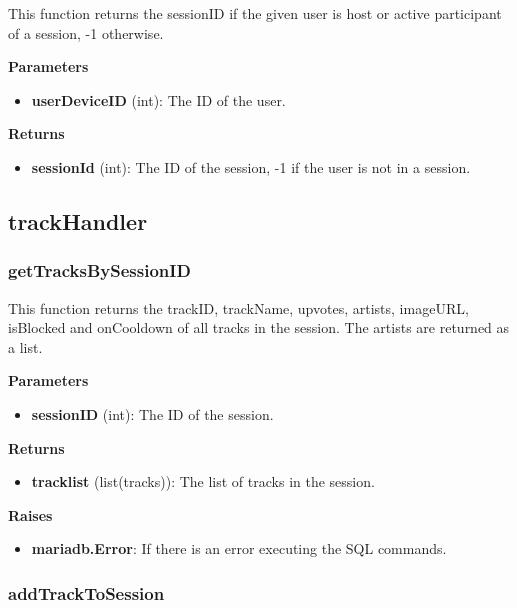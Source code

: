 \documentclass[oneside, ngerman]{sdqtechreport}
\begin{document}
This function returns the sessionID if the given user is host or active participant of a session, -1 otherwise.

\textbf{Parameters}

\begin{itemize}
    \item \textbf{userDeviceID} (int): The ID of the user.
\end{itemize}

\textbf{Returns}

\begin{itemize}
    \item \textbf{sessionId} (int): The ID of the session, -1 if the user is not in a session.
\end{itemize}



\subsection{trackHandler}

\subsubsection{getTracksBySessionID}

This function returns the trackID, trackName, upvotes, artists, imageURL, isBlocked and onCooldown of all tracks in the session. The artists are returned as a list.

\textbf{Parameters}

\begin{itemize} \item \textbf{sessionID} (int): The ID of the session. \end{itemize}

\textbf{Returns}

\begin{itemize} \item \textbf{tracklist} (list(tracks)): The list of tracks in the session. \end{itemize}

\textbf{Raises}

\begin{itemize} \item \textbf{mariadb.Error}: If there is an error executing the SQL commands. \end{itemize}

\subsubsection{addTrackToSession}
\end{document}
